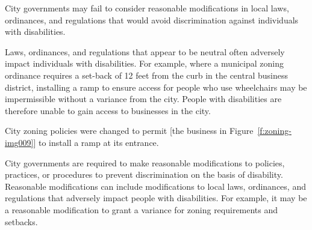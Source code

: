 

City governments may fail to consider reasonable modifications in local laws,
ordinances, and regulations that would avoid discrimination against individuals
with disabilities.



Laws, ordinances, and regulations that appear to be neutral often adversely
impact individuals with disabilities. For example, where a municipal zoning
ordinance requires a set-back of 12 feet from the curb in the central business
district, installing a ramp to ensure access for people who use wheelchairs may
be impermissible without a variance from the city. People with disabilities are
therefore unable to gain access to businesses in the city.

City zoning policies were changed to permit [the business in
Figure~\ref{f:zoning-img009}] to install a ramp at its entrance.


City governments are required to make reasonable modifications to policies,
practices, or procedures to prevent discrimination on the basis of disability.
Reasonable modifications can include modifications to local laws, ordinances,
and regulations that adversely impact people with disabilities. For example, it
may be a reasonable modification to grant a variance for zoning requirements and
setbacks. 

